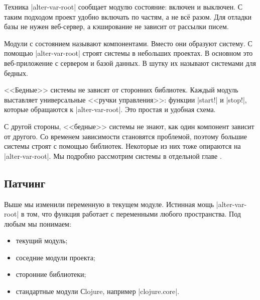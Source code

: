 
\label{systems-intro}

Техника \spverb|alter-var-root| сообщает модулю состояние: включен и выключен. С
таким подходом проект удобно включать по частям, а не вс\"{е} разом. Для отладки
базы не нужен веб-сервер, а кэширование не зависит от рассылки писем.

Модули с состоянием называют компонентами. Вместо они образуют систему. С
помощью \spverb|alter-var-root| строят системы в небольших проектах. В основном
это веб-приложение с сервером и базой данных. В шутку их называют системами для
бедных.


<<Бедные>> системы не зависят от сторонних библиотек. Каждый модуль выставляет
универсальные <<ручки управления>>: функции \spverb|start!| и \spverb|stop!|,
которые обращаются к \spverb|alter-var-root|. Это простая и удобная схема.

С другой стороны, <<бедные>> системы не знают, как один компонент зависит от
другого. Со временем зависимости становятся проблемой, поэтому большие системы
строят с помощью библиотек. Некоторые из них тоже опираются на
\spverb|alter-var-root|. Мы подробно рассмотрим системы в отдельной
главе .

\subsection{Патчинг}


Выше мы изменили переменную в текущем модуле. Истинная мощь
\spverb|alter-var-root| в том, что функция работает с переменными любого
пространства. Под любым мы понимаем:

\begin{itemize}

\item
  текущий модуль;

\item
  соседние модули проекта;

\item
  сторонние библиотеки;

\item
  стандартные модули Сlojure, например \spverb|clojure.core|.

\end{itemize}


